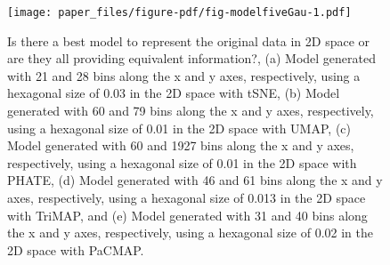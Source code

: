 \documentclass[
  12pt]{article}
\begin{document}
\begin{figure}

{\centering \texttt{[image: paper\_files/figure-pdf/fig-modelfiveGau-1.pdf]}

}

\caption{\label{fig-modelfiveGau}Is there a best model to represent the
original data in 2D space or are they all providing equivalent
information?, (a) Model generated with 21 and 28 bins along the x and y
axes, respectively, using a hexagonal size of 0.03 in the 2D space with
tSNE, (b) Model generated with 60 and 79 bins along the x and y axes,
respectively, using a hexagonal size of 0.01 in the 2D space with UMAP,
(c) Model generated with 60 and 1927 bins along the x and y axes,
respectively, using a hexagonal size of 0.01 in the 2D space with PHATE,
(d) Model generated with 46 and 61 bins along the x and y axes,
respectively, using a hexagonal size of 0.013 in the 2D space with
TriMAP, and (e) Model generated with 31 and 40 bins along the x and y
axes, respectively, using a hexagonal size of 0.02 in the 2D space with
PaCMAP.}

\end{figure}
\end{document}
